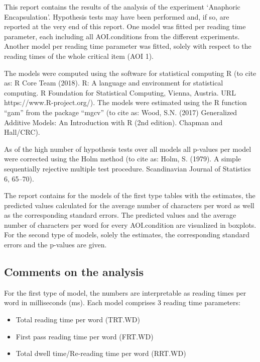This report contains the results of the analysis of the experiment ‘Anaphoric Encapsulation’. Hypothesis tests may have been performed and, if so, are reported at the very end of this report. One model was fitted per reading time parameter, each including all AOI.conditions from the different experiments. Another model per reading time parameter was fitted, solely with respect to the reading times of the whole critical item (AOI 1).

The models were computed using the software for statistical computing R (to cite as: R Core Team (2018). R: A language and environment for statistical computing. R Foundation for Statistical Computing, Vienna, Austria. URL https://www.R-project.org/). The models were estimated using the R function “gam” from the package “mgcv” (to cite as: Wood, S.N. (2017) Generalized Additive Models: An Introduction with R (2nd edition). Chapman and Hall/CRC).

As of the high number of hypothesis tests over all models all p-values per model were corrected using the Holm method (to cite as: Holm, S. (1979). A simple sequentially rejective multiple test procedure. Scandinavian Journal of Statistics 6, 65–70).

The report contains for the models of the first type tables with the estimates, the predicted values calculated for the average number of characters per word as well as the corresponding standard errors. The predicted values and the average number of characters per word for every AOI.condition are visualized in boxplots. For the second type of models, solely the estimates, the corresponding standard errors and the p-values are given.

\subsection{Comments on the analysis}

For the first type of model, the numbers are interpretable as reading times per word in milliseconds (ms). Each model comprises 3 reading time parameters:
\begin{itemize}
  \item Total reading time per word {\footnotesize (TRT.WD)}
  \item First pass reading time per word {\footnotesize (FRT.WD)} 
  \item Total dwell time/Re-reading time per word {\footnotesize (RRT.WD)} %
\end{itemize}

